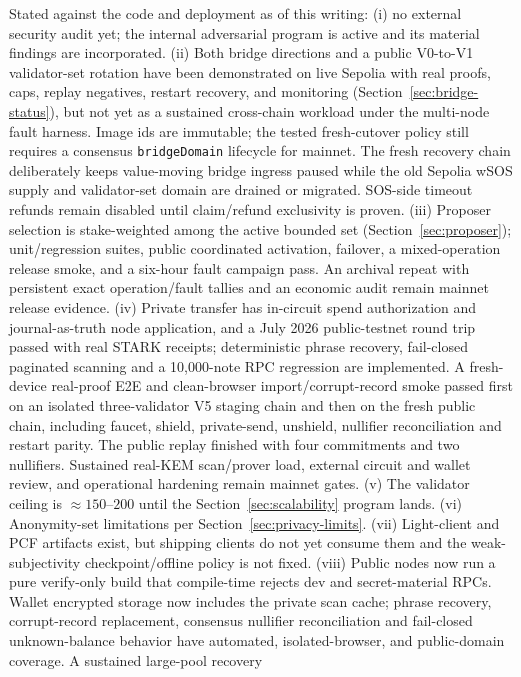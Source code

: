\documentclass[11pt]{article}
\newcommand{\code}[1]{\texttt{#1}}
\theoremstyle{plain}
\theoremstyle{definition}
\theoremstyle{remark}
\begin{document}
Stated against the code and deployment as of this writing: (i) no external
security audit yet; the internal adversarial program is active and its material
findings are incorporated. (ii) Both bridge directions and a public V0-to-V1
validator-set rotation have been demonstrated on live Sepolia with real proofs,
caps, replay negatives, restart recovery, and monitoring
(Section~\ref{sec:bridge-status}), but not yet as a sustained cross-chain
workload under the multi-node fault harness. Image ids are immutable; the tested
fresh-cutover policy still requires a consensus \code{bridgeDomain} lifecycle
for mainnet. The fresh recovery chain deliberately keeps value-moving bridge
ingress paused while the old Sepolia wSOS supply and validator-set domain are
drained or migrated. SOS-side timeout refunds remain disabled until
claim/refund exclusivity is proven. (iii) Proposer selection is stake-weighted among the
active bounded set (Section~\ref{sec:proposer}); unit/regression suites, public
coordinated activation, failover, a mixed-operation release smoke, and a six-hour
fault campaign pass. An archival repeat with persistent exact operation/fault
tallies and an economic audit remain mainnet release evidence. (iv) Private
transfer has in-circuit spend authorization and journal-as-truth node
application, and a July 2026 public-testnet round trip passed with real STARK
receipts; deterministic phrase recovery, fail-closed paginated scanning and a
10,000-note RPC regression are implemented. A fresh-device real-proof E2E and
clean-browser import/corrupt-record smoke passed first on an isolated
three-validator V5 staging chain and then on the fresh public chain, including
faucet, shield, private-send, unshield, nullifier reconciliation and restart
parity. The public replay finished with four commitments and two nullifiers.
Sustained real-KEM scan/prover load, external circuit and wallet review, and
operational hardening remain mainnet gates. (v) The validator ceiling is
$\approx 150$--$200$ until the Section~\ref{sec:scalability} program lands.
(vi) Anonymity-set limitations per Section~\ref{sec:privacy-limits}.
(vii) Light-client and PCF artifacts exist, but shipping clients do not yet
consume them and the weak-subjectivity checkpoint/offline policy is not fixed.
(viii) Public nodes now run a pure verify-only build that compile-time rejects
dev and secret-material RPCs. Wallet encrypted storage now includes the private
scan cache; phrase recovery, corrupt-record replacement, consensus nullifier
reconciliation and fail-closed unknown-balance behavior have automated,
isolated-browser, and public-domain coverage. A sustained large-pool recovery
\end{document}

